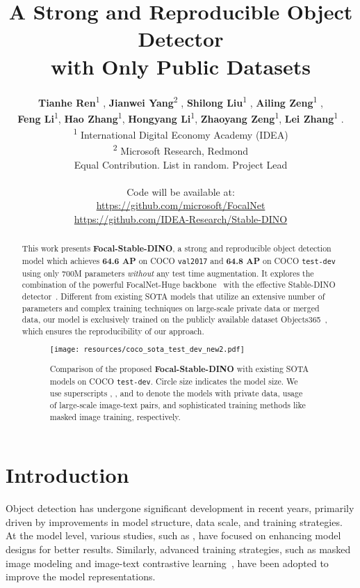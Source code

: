 \documentclass{article}
\title{A Strong and Reproducible Object Detector \\ with Only Public Datasets}
\author{\textbf{Tianhe Ren}\textsuperscript{\rm 1 },\; \textbf{Jianwei Yang}\textsuperscript{\rm 2 },\; \textbf{Shilong Liu}\textsuperscript{\rm 1 },\; \textbf{Ailing Zeng}\textsuperscript{\rm 1 }, \\
  \textbf{Feng Li}\textsuperscript{\rm 1},\; \textbf{Hao Zhang}\textsuperscript{\rm 1},\; \textbf{Hongyang Li}\textsuperscript{\rm 1},\; \textbf{Zhaoyang Zeng}\textsuperscript{\rm 1},\; \textbf{Lei Zhang}\textsuperscript{\rm 1 }.
  \vspace{0.2cm} \\
    \textsuperscript{\rm 1} International Digital Economy Academy (IDEA)\\
    \textsuperscript{\rm 2} Microsoft Research, Redmond  \\
     Equal Contribution. List in random.  Project Lead \\\\
    Code will be available at: \\
    \url{https://github.com/microsoft/FocalNet} \\
    \url{https://github.com/IDEA-Research/Stable-DINO}
}
\begin{document}
\maketitle








\begin{abstract}


This work presents \textbf{Focal-Stable-DINO}, a strong and reproducible object detection model which achieves \textbf{64.6 AP} on COCO \texttt{val2017} and \textbf{64.8 AP} on COCO \texttt{test-dev} using only 700M parameters \emph{without} any test time augmentation. It explores the combination of the powerful FocalNet-Huge backbone~\cite{yang2022focal} with the effective Stable-DINO detector~\cite{liu2023detection}. Different from existing SOTA models that utilize an extensive number of parameters and complex training techniques on large-scale private data or merged data, our model is exclusively trained on the publicly available dataset Objects365~\cite{shao2019objects365}, which ensures the reproducibility of our approach. 










  \begin{figure}[h]
    \centering
\texttt{[image: resources/coco\_sota\_test\_dev\_new2.pdf]}
    \vspace{-0.2cm}
    \caption{Comparison of the proposed \textbf{Focal-Stable-DINO} with existing SOTA models on COCO \texttt{test-dev}. Circle size indicates the model size. We use superscripts , , and  to denote the models with private data, usage of large-scale image-text pairs, 
    and sophisticated training methods like masked image training, respectively.
}
    \label{fig:coco_sota_testdev}
\end{figure} 
\end{abstract} 
\section{Introduction}
Object detection has undergone significant development in recent years, primarily driven by improvements in model structure, data scale, and training strategies. At the model level, various studies, such as \cite{gao2021fast, ren2015faster, liu2022dabdetr, li2022dn, zhang2022dino, stabledino, hu2023yoso}, have focused on enhancing model designs for better results. Similarly, advanced training strategies, such as masked image modeling \cite{mae, chen2022group} and image-text contrastive learning~\cite{yuan2021florence, yang2022unified, fang2022eva}, have been adopted to improve the model representations.
\end{document}

